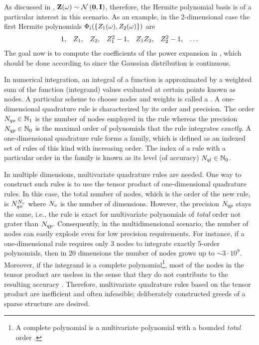 As discussed in , $\vZ(\o) \sim \normal{\vZero}{\mI}$, therefore, the Hermite polynomial basis is of a particular interest in this scenario. As an example, in the 2-dimensional case the first Hermite polynomials $\Phi_i(\{ Z_1(\omega), Z_2(\omega) \})$ are
\[
  \begin{array}{lllllll}
  1, & Z_1, & Z_2, & Z_1^2 - 1, & Z_1 Z_2, & Z_2^2 - 1, & \dotsc
  \end{array}
\]
The goal now is to compute the coefficients of the power expansion in , which should be done according to  since the Gaussian distribution is continuous.

In numerical integration, an integral of a function is approximated by a weighted sum of the function (integrand) values evaluated at certain points known as nodes. A particular scheme to choose nodes and weights is called a . A one-dimensional quadrature rule is characterized by its order and precision. The order $N_{qo} \in \mathbb{N}_{1}$ is the number of nodes employed in the rule whereas the precision $N_{qp} \in \mathbb{N}_{0}$ is the maximal order of polynomials that the rule integrates \emph{exactly}. A one-dimensional quadrature rule forms a family, which is defined as an indexed set of rules of this kind with increasing order. The index of a rule with a particular order in the family is known as its level (of accuracy) $N_{ql} \in \mathbb{N}_{0}$.

In multiple dimensions, multivariate quadrature rules are needed. One way to construct such rules is to use the tensor product of one-dimensional quadrature rules. In this case, the total number of nodes, which is the order of the new rule, is $N_{qo}^{N_v}$ where ${N_v}$ is the number of dimensions. However, the precision $N_{qp}$ stays the same, i.e., the rule is exact for multivariate polynomials of \emph{total} order not grater than $N_{qp}$. Consequently, in the multidimensional scenario, the number of nodes can easily explode even for low precision requirements. For instance, if a one-dimensional rule requires only 3 nodes to integrate exactly 5-order polynomials, then in 20 dimensions the number of nodes grows up to $\sim 3 \cdot 10^9$. Moreover, if the integrand is a complete polynomial\footnote{A complete polynomial is a multivariate polynomial with a bounded \emph{total} order \cite{heiss2008}.}, most of the nodes in the tensor product are useless in the sense that they do not contribute to the resulting accuracy \cite{heiss2008, burkardt2011}. Therefore, multivariate quadrature rules based on the tensor product are inefficient and often infeasible; deliberately constructed greeds of a sparse structure are desired.

